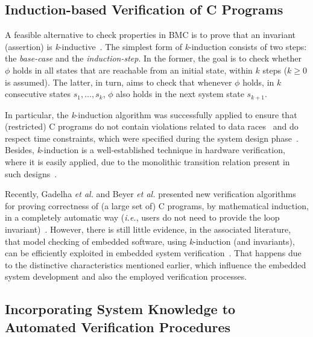 \documentclass{acm_sen_article}
\begin{document}
\subsection{Induction-based Verification of C Programs}

A feasible alternative to check properties in BMC is to prove that an invariant (assertion) is \textit{k}-inductive~\cite{EenS03,Sheera00}. 
The simplest form of \textit{k}-induction consists of two steps: the \textit{base-case} and the \textit{induction-step}. In the former, the goal is to check whether $\phi$ holds in all states that are reachable from an initial state, within $k$ steps ($k \geq 0$ is assumed). The latter, in turn, aims to check that whenever $\phi$ holds, in $k$ consecutive states $s_1,\ldots,s_k$, $\phi$ also holds in the next system state $s_{k+1}$. 

In particular, the \textit{k}-induction algorithm was successfully applied to ensure that (restricted) C programs do not contain violations related to data races~\cite{Donaldson10,Kinductor} and do respect time constraints, which were specified during the system design phase~\cite{EenS03}. Besides, \textit{k}-induction is a well-established technique in hardware verification, where it is easily applied, due to the monolithic transition relation present in such designs~\cite{EenS03,GrosseLD09,Sheera00}. 

Recently, Gadelha {\it et al.} and Beyer {\it et al.} presented new verification algorithms for proving correctness of (a large set of) C programs, by mathematical induction, in a completely automatic way ({\it i.e.}, users do not need to provide the loop invariant)~\cite{Gadelha15,Beyer15}. However, there is still little evidence, in the associated literature, that model checking of embedded software, using \textit{k}-induction (and invariants), can be efficiently exploited in embedded system verification~\cite{Rocha15,Brain15}. That happens due to the distinctive characteristics mentioned earlier, which influence the embedded system development and also the employed verification processes.

\subsection{Incorporating System Knowledge to Automated Verification Procedures}
\end{document}
